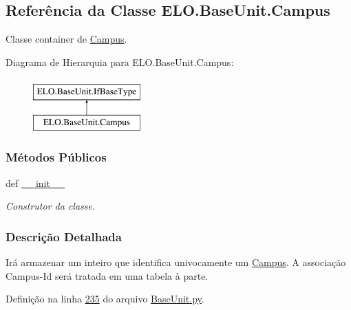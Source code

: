 \hypertarget{classELO_1_1BaseUnit_1_1Campus}{\subsection{Referência da Classe E\-L\-O.\-Base\-Unit.\-Campus}
\label{classELO_1_1BaseUnit_1_1Campus}
}


Classe container de \hyperlink{classELO_1_1BaseUnit_1_1Campus}{Campus}.  


Diagrama de Hierarquia para E\-L\-O.\-Base\-Unit.\-Campus\-:\begin{figure}[H]
\begin{center}
\leavevmode
\includegraphics[height=2.000000cm]{d4/d76/classELO_1_1BaseUnit_1_1Campus}
\end{center}
\end{figure}
\subsubsection*{Métodos Públicos}
\begin{DoxyCompactItemize}
\item 
def \hyperlink{classELO_1_1BaseUnit_1_1Campus_abd800984df4eb26836d305682d84dfa9}{\-\_\-\-\_\-init\-\_\-\-\_\-}
\begin{DoxyCompactList}\small\item\em Construtor da classe. \end{DoxyCompactList}\end{DoxyCompactItemize}


\subsubsection{Descrição Detalhada}
Irá armazenar um inteiro que identifica univocamente um \hyperlink{classELO_1_1BaseUnit_1_1Campus}{Campus}. A associação Campus-\/\-Id será tratada em uma tabela à parte. 

Definição na linha \hyperlink{BaseUnit_8py_source_l00235}{235} do arquivo \hyperlink{BaseUnit_8py_source}{Base\-Unit.\-py}.



